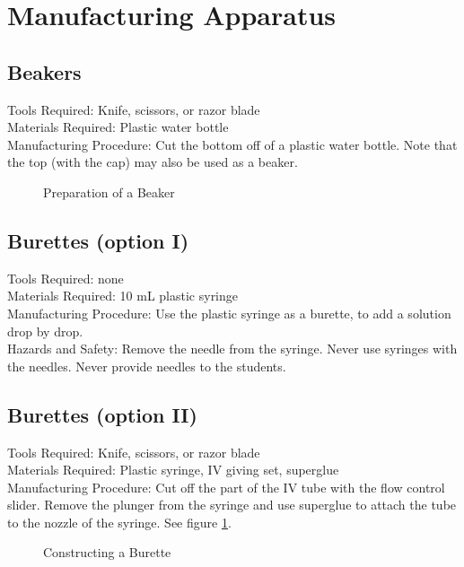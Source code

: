 \section{Manufacturing Apparatus}

\subsection*{Beakers}
Tools Required: Knife, scissors, or razor blade\\
Materials Required: Plastic water bottle\\
Manufacturing Procedure: Cut the bottom off of a plastic water bottle. Note that the top (with the cap) may also be used as a beaker.
\begin{figure}[h]
\begin{center}
\def\svgwidth{200pt}

\caption{Preparation of a Beaker}
\end{center}
\end{figure}

\subsection*{Burettes (option I)}
Tools Required: none\\
Materials Required: 10 mL plastic syringe\\
Manufacturing Procedure: Use the plastic syringe as a burette, to add a solution drop by drop.
\\Hazards and Safety: Remove the needle from the syringe. Never use syringes with the needles. Never provide needles to the students.

\subsection*{Burettes (option II)}
Tools Required: Knife, scissors, or razor blade\\
Materials Required: Plastic syringe, IV giving set, superglue\\
Manufacturing Procedure: Cut off the part of the IV tube with the flow control slider. Remove the plunger from the syringe and use superglue to attach the tube to the nozzle of the syringe. See figure \ref{fig:burette}.


\begin{figure}[h]
\begin{center}
\caption{Constructing a Burette}
\label{fig:burette}
\end{center}
\end{figure}

